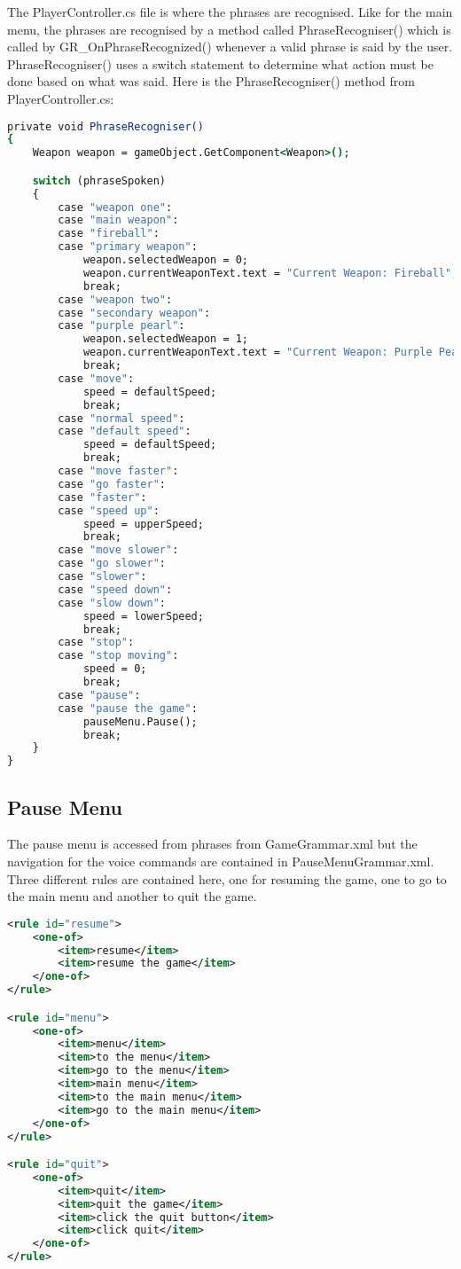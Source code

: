\documentclass{article}
\begin{document}
The PlayerController.cs file is where the phrases are recognised. Like for the main menu, the phrases are recognised by a method called PhraseRecogniser() which is called by GR\_OnPhraseRecognized() whenever a valid phrase is said by the user. PhraseRecogniser() uses a switch statement to determine what action must be done based on what was said. Here is the PhraseRecogniser() method from PlayerController.cs:
\begin{lstlisting}[language=csh]
private void PhraseRecogniser()
{
    Weapon weapon = gameObject.GetComponent<Weapon>();

    switch (phraseSpoken)
    {
        case "weapon one":
        case "main weapon":
        case "fireball":
        case "primary weapon":
            weapon.selectedWeapon = 0;
            weapon.currentWeaponText.text = "Current Weapon: Fireball";
            break;
        case "weapon two":
        case "secondary weapon":
        case "purple pearl":
            weapon.selectedWeapon = 1;
            weapon.currentWeaponText.text = "Current Weapon: Purple Pearl";
            break;
        case "move":
            speed = defaultSpeed;
            break;
        case "normal speed":
        case "default speed":
            speed = defaultSpeed;
            break;
        case "move faster":
        case "go faster":
        case "faster":
        case "speed up":
            speed = upperSpeed;
            break;
        case "move slower":
        case "go slower":
        case "slower":
        case "speed down":
        case "slow down":
            speed = lowerSpeed;
            break;
        case "stop":
        case "stop moving":
            speed = 0;
            break;
        case "pause":
        case "pause the game":
            pauseMenu.Pause();
            break;
    }
}
\end{lstlisting}

\subsection{Pause Menu}
The pause menu is accessed from phrases from GameGrammar.xml but the navigation for the voice commands are contained in PauseMenuGrammar.xml. Three different rules are contained here, one for resuming the game, one to go to the main menu and another to quit the game.
\begin{lstlisting}[language=XML]
<rule id="resume">
    <one-of>
        <item>resume</item>
        <item>resume the game</item>
    </one-of>
</rule>

<rule id="menu">
    <one-of>
        <item>menu</item>
        <item>to the menu</item>
        <item>go to the menu</item>
        <item>main menu</item>
        <item>to the main menu</item>
        <item>go to the main menu</item>
    </one-of>
</rule>

<rule id="quit">
    <one-of>
        <item>quit</item>
        <item>quit the game</item>
        <item>click the quit button</item>
        <item>click quit</item>
    </one-of>
</rule>
\end{lstlisting}
\end{document}
